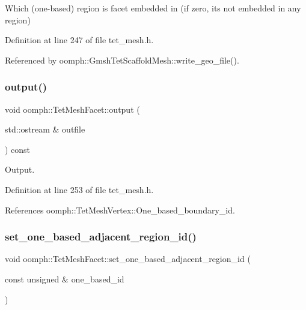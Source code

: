 Which (one-\/based) region is facet embedded in (if zero, it\textquotesingle{}s not embedded in any region) 

Definition at line 247 of file tet\+\_\+mesh.\+h.



Referenced by oomph\+::\+Gmsh\+Tet\+Scaffold\+Mesh\+::write\+\_\+geo\+\_\+file().

\mbox{\label{classoomph_1_1TetMeshFacet_a10fc468ac2700b4fdd96168a5b17eca3}} 
\subsubsection{\texorpdfstring{output()}{output()}}
{\footnotesize\ttfamily void oomph\+::\+Tet\+Mesh\+Facet\+::output (\begin{DoxyParamCaption}\item[{std\+::ostream \&}]{outfile }\end{DoxyParamCaption}) const\hspace{0.3cm}{\ttfamily [inline]}}



Output. 



Definition at line 253 of file tet\+\_\+mesh.\+h.



References oomph\+::\+Tet\+Mesh\+Vertex\+::\+One\+\_\+based\+\_\+boundary\+\_\+id.

\mbox{\label{classoomph_1_1TetMeshFacet_ac9be074ef764a6b59cbef9840fe7f38b}} 
\subsubsection{\texorpdfstring{set\+\_\+one\+\_\+based\+\_\+adjacent\+\_\+region\+\_\+id()}{set\_one\_based\_adjacent\_region\_id()}}
{\footnotesize\ttfamily void oomph\+::\+Tet\+Mesh\+Facet\+::set\+\_\+one\+\_\+based\+\_\+adjacent\+\_\+region\+\_\+id (\begin{DoxyParamCaption}\item[{const unsigned \&}]{one\+\_\+based\+\_\+id }\end{DoxyParamCaption})\hspace{0.3cm}{\ttfamily [inline]}}



